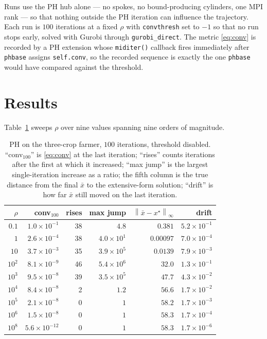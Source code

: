 \documentclass[11pt]{article}
\newcommand{\norm}[1]{\left\lVert #1 \right\rVert}
\newcommand{\xbar}{\bar{x}}
\begin{document}
Runs use the PH hub alone --- no spokes, no bound-producing cylinders, one MPI
rank --- so that nothing outside the PH iteration can influence the
trajectory.  Each run is $100$ iterations at a fixed $\rho$ with
\texttt{convthresh} set to $-1$ so that no run stops early, solved with Gurobi
through \texttt{gurobi\_direct}.  The metric \eqref{eq:conv} is recorded by a PH
extension whose \texttt{miditer()} callback fires immediately after
\texttt{phbase} assigns \texttt{self.conv}, so the recorded sequence is exactly
the one \texttt{phbase} would have compared against the threshold.

\section{Results}

Table~\ref{tab:sweep} sweeps $\rho$ over nine values spanning nine orders of
magnitude.

\begin{table}[t]
\centering
\begin{tabular}{rrrrrr}
\toprule
$\rho$ & conv$_{100}$ & rises & max jump & $\norm{\xbar - x^\star}_\infty$ & drift \\
\midrule
$0.1$    & $1.0\times10^{-1}$  & 38 & $4.8$               & $0.381$   & $5.2\times10^{-1}$ \\
$1$      & $2.6\times10^{-4}$  & 38 & $4.0\times10^{1}$   & $0.00097$ & $7.0\times10^{-4}$ \\
$10$     & $3.7\times10^{-3}$  & 35 & $3.9\times10^{5}$   & $0.0139$  & $7.9\times10^{-3}$ \\
$10^{2}$ & $8.1\times10^{-9}$  & 46 & $5.4\times10^{6}$   & $32.0$    & $1.3\times10^{-1}$ \\
$10^{3}$ & $9.5\times10^{-8}$  & 39 & $3.5\times10^{5}$   & $47.7$    & $4.3\times10^{-2}$ \\
$10^{4}$ & $8.4\times10^{-8}$  &  2 & $1.2$               & $56.6$    & $1.7\times10^{-2}$ \\
$10^{5}$ & $2.1\times10^{-8}$  &  0 & $1$                 & $58.2$    & $1.7\times10^{-3}$ \\
$10^{6}$ & $1.5\times10^{-8}$  &  0 & $1$                 & $58.3$    & $1.7\times10^{-4}$ \\
$10^{8}$ & $5.6\times10^{-12}$ &  0 & $1$                 & $58.3$    & $1.7\times10^{-6}$ \\
\bottomrule
\end{tabular}
\caption{PH on the three-crop farmer, $100$ iterations, threshold disabled.
``conv$_{100}$'' is \eqref{eq:conv} at the last iteration; ``rises'' counts
iterations after the first at which it increased; ``max jump'' is the largest
single-iteration increase as a ratio; the fifth column is the true distance
from the final $\xbar$ to the extensive-form solution; ``drift'' is how far
$\xbar$ still moved on the last iteration.}
\label{tab:sweep}
\end{table}
\end{document}

